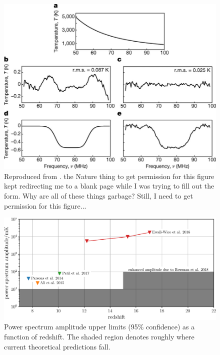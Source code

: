 \begin{bibunit}
\begin{figure}[t]
    \centering
    \includegraphics[width=\textwidth]{figures/chapter1/bowman-2018-absorption-trough}
    \caption{
        Reproduced from \citet{2018Natur.555...67B}.
        the Nature thing to get permission for this figure kept redirecting me to a blank page while
        I was trying to fill out the form. Why are all of these things garbage? Still, I need to get
        permission for this figure...
    }
    \label{fig:bowman-absorption-trough}
\end{figure}

\begin{figure}[t]
    \centering
    \includegraphics[width=\textwidth]{figures/chapter1/power-spectrum-upper-limits/power-spectrum-upper-limits}
    \caption{
        Power spectrum amplitude upper limits (95\% confidence) as a function of redshift. The
        shaded region denotes roughly where current theoretical predictions fall.
    }
    \label{fig:power-spectrum-upper-limits}
\end{figure}












\end{bibunit}

